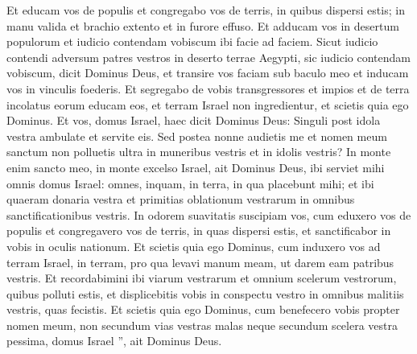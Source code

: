 \begin{biblechapter}
\begin{biblechapter}
\begin{biblechapter}
\begin{biblechapter}
\begin{biblechapter}
\begin{biblechapter}
\begin{biblechapter}
\begin{biblechapter}
\begin{biblechapter}
\begin{biblechapter}
\begin{biblechapter}
\begin{biblechapter}
\begin{biblechapter}
\begin{biblechapter}
\begin{biblechapter}
\begin{biblechapter}
\begin{biblechapter}
\begin{biblechapter}
\begin{biblechapter}
\begin{biblechapter}
\verse Et educam vos de populis et congregabo vos de terris, in quibus dispersi estis; in manu valida et brachio extento et in furore effuso. 
\verse Et adducam vos in desertum populorum et iudicio contendam vobiscum ibi facie ad faciem. 
\verse Sicut iudicio contendi adversum patres vestros in deserto terrae Aegypti, sic iudicio contendam vobiscum, dicit Dominus Deus, 
\verse et transire vos faciam sub baculo meo et inducam vos in vinculis foederis. 
\verse Et segregabo de vobis transgressores et impios et de terra incolatus eorum educam eos, et terram Israel non ingredientur, et scietis quia ego Dominus. 
\verse Et vos, domus Israel, haec dicit Dominus Deus: Singuli post idola vestra ambulate et servite eis. Sed postea nonne audietis me et nomen meum sanctum non polluetis ultra in muneribus vestris et in idolis vestris? 
\verse In monte enim sancto meo, in monte excelso Israel, ait Dominus Deus, ibi serviet mihi omnis domus Israel: omnes, inquam, in terra, in qua placebunt mihi; et ibi quaeram donaria vestra et primitias oblationum vestrarum in omnibus sanctificationibus vestris. 
\verse In odorem suavitatis suscipiam vos, cum eduxero vos de populis et congregavero vos de terris, in quas dispersi estis, et sanctificabor in vobis in oculis nationum. 
\verse Et scietis quia ego Dominus, cum induxero vos ad terram Israel, in terram, pro qua levavi manum meam, ut darem eam patribus vestris. 
\verse Et recordabimini ibi viarum vestrarum et omnium scelerum vestrorum, quibus polluti estis, et displicebitis vobis in conspectu vestro in omnibus malitiis vestris, quas fecistis. 
\verse Et scietis quia ego Dominus, cum benefecero vobis propter nomen meum, non secundum vias vestras malas neque secundum scelera vestra pessima, domus Israel ”, ait Dominus Deus.
 

\end{biblechapter}
\end{biblechapter}
\end{biblechapter}
\end{biblechapter}
\end{biblechapter}
\end{biblechapter}
\end{biblechapter}
\end{biblechapter}
\end{biblechapter}
\end{biblechapter}
\end{biblechapter}
\end{biblechapter}
\end{biblechapter}
\end{biblechapter}
\end{biblechapter}
\end{biblechapter}
\end{biblechapter}
\end{biblechapter}
\end{biblechapter}
\end{biblechapter}
